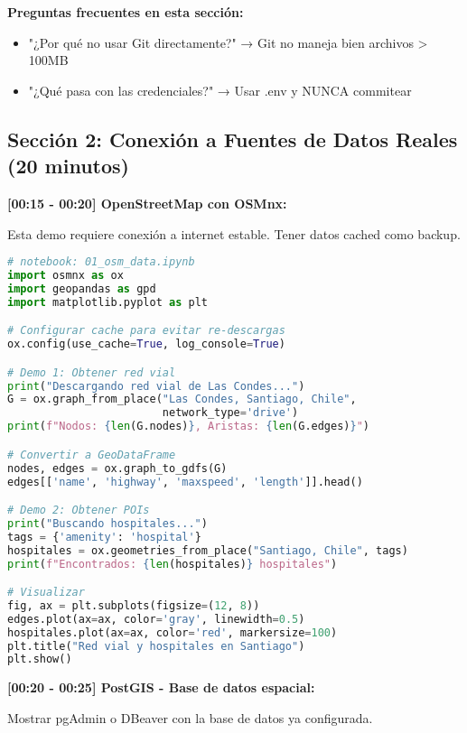 \documentclass[11pt,a4paper]{article}
\begin{document}
\textbf{Preguntas frecuentes en esta sección:}
\begin{itemize}
    \item "¿Por qué no usar Git directamente?" → Git no maneja bien archivos > 100MB
    \item "¿Qué pasa con las credenciales?" → Usar .env y NUNCA commitear
\end{itemize}

\subsection{Sección 2: Conexión a Fuentes de Datos Reales (20 minutos)}

\textbf{[00:15 - 00:20] OpenStreetMap con OSMnx:}

\begin{alertbox}
Esta demo requiere conexión a internet estable. Tener datos cached como backup.
\end{alertbox}

\begin{lstlisting}[language=Python]
# notebook: 01_osm_data.ipynb
import osmnx as ox
import geopandas as gpd
import matplotlib.pyplot as plt

# Configurar cache para evitar re-descargas
ox.config(use_cache=True, log_console=True)

# Demo 1: Obtener red vial
print("Descargando red vial de Las Condes...")
G = ox.graph_from_place("Las Condes, Santiago, Chile", 
                        network_type='drive')
print(f"Nodos: {len(G.nodes)}, Aristas: {len(G.edges)}")

# Convertir a GeoDataFrame
nodes, edges = ox.graph_to_gdfs(G)
edges[['name', 'highway', 'maxspeed', 'length']].head()

# Demo 2: Obtener POIs
print("Buscando hospitales...")
tags = {'amenity': 'hospital'}
hospitales = ox.geometries_from_place("Santiago, Chile", tags)
print(f"Encontrados: {len(hospitales)} hospitales")

# Visualizar
fig, ax = plt.subplots(figsize=(12, 8))
edges.plot(ax=ax, color='gray', linewidth=0.5)
hospitales.plot(ax=ax, color='red', markersize=100)
plt.title("Red vial y hospitales en Santiago")
plt.show()
\end{lstlisting}

\textbf{[00:20 - 00:25] PostGIS - Base de datos espacial:}

\begin{demobox}
Mostrar pgAdmin o DBeaver con la base de datos ya configurada.
\end{demobox}
\end{document}
